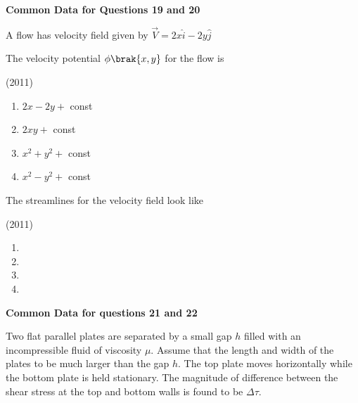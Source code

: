 \iffalse
	\chapter{2011}
	\author{AI24BTECH11003}
	\section{xe}
\fi

\item[] \textbf{Common Data for Questions 19 and 20}

A flow has velocity field given by $\overrightarrow{V}=2x\hat{i}-2y\hat{j}$

	\item The velocity potential $\phi\brak{x,y}$ for the flow is
    
    \hfill{(2011)}

        \begin{multicols}{4}
            \begin{enumerate}
                \item $2x-2y+$ const
                \item $2xy+$ const
                \item $x^2+y^2+$ const
                \item $x^2-y^2+$ const
            \end{enumerate}
        \end{multicols}

    \item The streamlines for the velocity field look like
    
    \hfill{(2011)}

        \begin{multicols}{4}
            \begin{enumerate}
                \item 
                \item 
                \item 
                \item 
            \end{enumerate}
        \end{multicols}
        
\item[] \textbf{Common Data for questions 21 and 22}

Two flat parallel plates are separated by a small gap $h$ filled with an incompressible fluid of viscosity $\mu$. Assume that the length and width of the plates to be much larger than the gap $h$. The top plate moves horizontally while the bottom plate is held stationary. The magnitude of difference between the shear stress at the top and bottom walls is found to be $\Delta\tau$.
    
